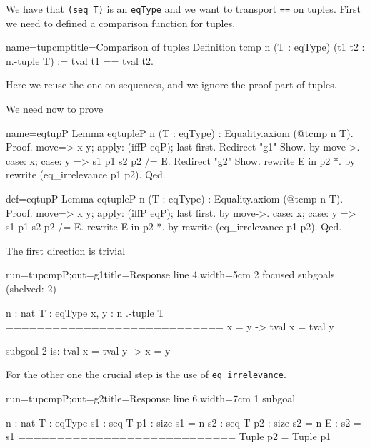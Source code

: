 
We have that \lstinline/(seq T)/ is an \lstinline/eqType/ and
we want to transport \lstinline/==/ on tuples.  First we need to
defined a comparison function for tuples.

\begin{coq}{name=tupcmp}{title=Comparison of tuples}
Definition tcmp n (T : eqType) (t1 t2 : n.-tuple T) :=
  tval t1 == tval t2.
\end{coq}

Here we reuse the one on sequences, and we ignore the
proof part of tuples.

We need now to prove

\begin{coqdef}{name=eqtupP}
Lemma eqtupleP n (T : eqType) : Equality.axiom (@tcmp n T).
Proof.
move=> x y; apply: (iffP eqP); last first.
Redirect "g1" Show.
  by move->.
case: x; case: y => s1 p1 s2 p2 /= E. Redirect "g2" Show.
rewrite E in p2 *.
by rewrite (eq_irrelevance p1 p2).
Qed.
\end{coqdef}
\begin{coq}{def=eqtupP}{}
Lemma eqtupleP n (T : eqType) : Equality.axiom (@tcmp n T).
Proof.
move=> x y; apply: (iffP eqP); last first.
  by move->.
case: x; case: y => s1 p1 s2 p2 /= E.
rewrite E in p2 *.
by rewrite (eq_irrelevance p1 p2).
Qed.
\end{coq}

The first direction is trivial

\begin{coqout}{run=tupcmpP;out=g1}{title=Response line 4,width=5cm}
2 focused subgoals (shelved: 2)

n : nat
T : eqType
x, y : n .-tuple T
============================
x = y -> tval x = tval y

subgoal 2 is:
  tval x = tval y -> x = y
\end{coqout}

For the other one the crucial step is the use
of \lstinline/eq_irrelevance/.

\begin{coqout}{run=tupcmpP;out=g2}{title=Response line 6,width=7cm}
1 subgoal

n : nat
T : eqType
s1 : seq T
p1 : size s1 = n
s2 : seq T
p2 : size s2 = n
E : s2 = s1
============================
Tuple p2 = Tuple p1
\end{coqout}

